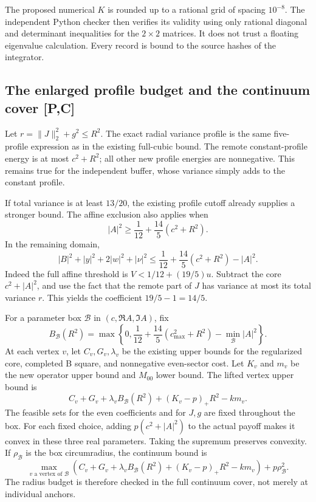 The proposed numerical \(K\) is rounded up to a rational grid
of spacing \(10^{-8}\). The independent Python checker then
verifies its validity using only rational diagonal and determinant
inequalities for the \(2\times2\) matrices.
It does not trust a floating eigenvalue calculation.
Every record is bound to the source hashes of the integrator.

\subsection{The enlarged profile budget and the continuum cover [P,C]}
Let \(r=\|J\|_2^2+g^2\le R^2\).
The exact radial variance profile is the same five-profile expression
as in the existing full-cubic bound. The remote constant-profile
energy is at most \(c^2+R^2\); all other new profile energies
are nonnegative.
This remains true for the independent buffer, whose variance simply
adds to the constant profile.

If total variance is at least \(13/20\), the existing profile cutoff
already supplies a stronger bound.
The affine exclusion also applies when
\[
 |A|^2\ge\frac1{12}+\frac{14}{5}(c^2+R^2).
 \tag{54.10}
\]
In the remaining domain,
\[
 |B|^2+|y|^2+2|w|^2+|\nu|^2
 \le\frac1{12}+\frac{14}{5}(c^2+R^2)-|A|^2.
 \tag{54.11}
\]
Indeed the full affine threshold is
\(V<1/12+(19/5)u\).
Subtract the core \(c^2+|A|^2\), and use the fact that the
remote part of \(J\) has variance at most its total variance \(r\).
This yields the coefficient \(19/5-1=14/5\).

For a parameter box \(\mathcal B\) in
\((c,\Re A,\Im A)\), fix
\[
 B_{\mathcal B}(R^2)=
 \max\left\{0,\frac1{12}+\frac{14}{5}
          (c_{\max}^2+R^2)-\min_{\mathcal B}|A|^2\right\}.
\]
At each vertex \(v\), let \(C_v,G_v,\lambda_v\) be the existing
upper bounds for the regularized core, completed B square, and
nonnegative even-sector cost. Let \(K_v\) and \(m_v\) be the new
operator upper bound and \(M_{00}\) lower bound.
The lifted vertex upper bound is
\[
 C_v+G_v+\lambda_v B_{\mathcal B}(R^2)
              +(K_v-p)_+R^2-km_v.
 \tag{54.12}
\]
The feasible sets for the even coefficients and for \(J,g\) are
fixed throughout the box.
For each fixed choice, adding \(p(c^2+|A|^2)\) to the actual
payoff makes it convex in these three real parameters.
Taking the supremum preserves convexity.
If \(\rho_{\mathcal B}\) is the box circumradius, the continuum bound is
\[
 \max_{v\text{ a vertex of }\mathcal B}\!
 \left(C_v+G_v+\lambda_v B_{\mathcal B}(R^2)
              +(K_v-p)_+R^2-km_v\right)+p\rho_{\mathcal B}^2.
 \tag{54.13}
\]
The radius budget is therefore checked in the full continuum cover,
not merely at individual anchors.

